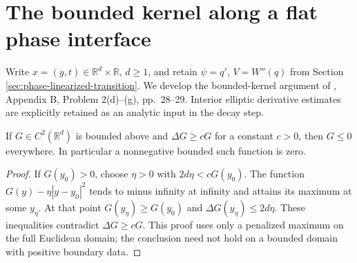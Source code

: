 \chapter{The bounded kernel along a flat phase interface}\label{sec:phase-flat-bounded-kernel}
Write $x=(y,t)\in\mathbb R^d\times\mathbb R$, $d\geq1$, and retain $\psi=q'$, $V=W''(q)$ from Section \ref{sec:phase-linearized-transition}. We develop the bounded-kernel argument of \cite{ChAC}, Appendix B, Problem 2(d)--(g), pp.~28--29. Interior elliptic derivative estimates are explicitly retained as an analytic input in the decay step.

\begin{lemma}\label{lem:positive-potential-bounded-subsolution}
If $G\in C^2(\mathbb R^d)$ is bounded above and $\Delta G\geq cG$ for a constant $c>0$, then $G\leq0$ everywhere. In particular a nonnegative bounded such function is zero.
\end{lemma}
\begin{proof}
If $G(y_0)>0$, choose $\eta>0$ with $2d\eta<cG(y_0)$. The function $G(y)-\eta|y-y_0|^2$ tends to minus infinity at infinity and attains its maximum at some $y_\eta$. At that point $G(y_\eta)\geq G(y_0)$ and $\Delta G(y_\eta)\leq2d\eta$. These inequalities contradict $\Delta G\geq cG$. This proof uses only a penalized maximum on the full Euclidean domain; the conclusion need not hold on a bounded domain with positive boundary data.
\end{proof}

